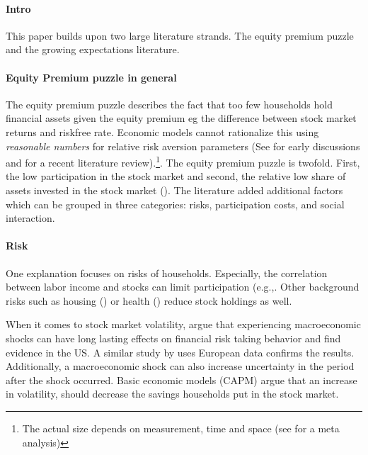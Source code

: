 \documentclass[ProjectABM]{subfiles}
\begin{document}
\paragraph{Intro}
This paper builds upon two large literature strands. The equity premium puzzle and the growing expectations literature.

\paragraph{Equity Premium puzzle in general}
The equity premium puzzle describes the fact that too few households hold financial assets given the equity premium eg the difference between stock market returns and riskfree rate. Economic models cannot rationalize this using \textit{reasonable numbers} for relative risk aversion parameters (See \cite{mehra_porescott_1985equity_premium, haliassos_bertraut_1995equity_premium} for early discussions and \cite{Gomes_et_al_2021} for a recent literature review).\footnote{ The actual size depends on measurement, time and space (see\cite{vanEwijk_et_al_2012meta_equity_premium} for a meta analysis)}. The equity premium puzzle is twofold. First, the low participation in the stock market and second, the relative low share of assets invested in the stock market (\cite{campbell_2006household_finance}). 
The literature added additional factors which can be grouped in three categories: risks, participation costs, and social interaction.

\paragraph{Risk}
One explanation focuses on risks of households. Especially, the correlation between labor income and stocks can limit participation (e.g.,\cite{BCG2007stocklabor}. Other background risks such as housing (\cite{cocco2005housing}) or health (\cite{GJT1996_health}) reduce stock holdings as well. 

When it comes to stock market volatility, \cite{malmendier_2011} argue that experiencing macroeconomic shocks can have long lasting effects on financial risk taking behavior and find evidence in the US. A similar study by \cite{ampudia_ehrmann_2017macroeconomic} uses European data confirms the results. 
Additionally, a macroeconomic shock can also increase uncertainty in the period after the shock occurred. Basic economic models (CAPM) argue that an increase in volatility, should decrease the savings households put in the stock market.
\end{document}
